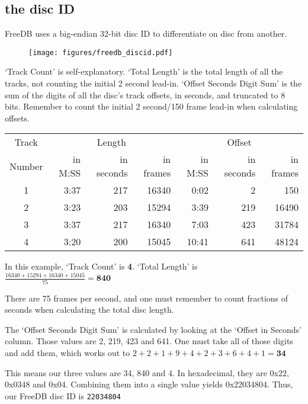 \pagebreak

\subsection{the disc ID}
FreeDB uses a big-endian 32-bit disc ID to differentiate
on disc from another.

\begin{figure}[h]
\texttt{[image: figures/freedb\_discid.pdf]}
\end{figure}
\par
\noindent
`Track Count' is self-explanatory.
`Total Length' is the total length of all the tracks, not
counting the initial 2 second lead-in.
`Offset Seconds Digit Sum' is the sum of the digits of all
the disc's track offsets, in seconds, and truncated to 8 bits.
Remember to count the initial 2 second/150 frame lead-in when calculating
offsets.
\begin{table}[h]
\begin{tabular}{|c||r|r|r||r|r|r|}
\hline
Track & \multicolumn{3}{c||}{Length} & \multicolumn{3}{c|}{Offset} \\
Number & in M:SS & in seconds & in frames & in M:SS & in seconds & in frames \\
\hline
1 & 3:37 & 217 & 16340 & 0:02 & 2 & 150 \\
2 & 3:23 & 203 & 15294 & 3:39 & 219 & 16490 \\
3 & 3:37 & 217 & 16340 & 7:03 & 423 & 31784 \\
4 & 3:20 & 200 & 15045 & 10:41 & 641 & 48124 \\
\hline
\end{tabular}
\end{table}
\par
\noindent
In this example, `Track Count' is \textbf{4}.
`Total Length' is
$\frac{16340 + 15294 + 16340 + 15045}{75} = \textbf{840}$

There are 75 frames per second, and one must remember to count
fractions of seconds when calculating the total disc length.

The `Offset Seconds Digit Sum' is calculated by looking at the
`Offset in Seconds' column.
Those values are 2, 219, 423 and 641.
One must take all of those digits and add them, which works out to
$2 + 2 + 1 + 9 + 4 + 2 + 3 + 6 + 4 + 1 = \textbf{34}$

This means our three values are 34, 840 and 4.
In hexadecimal, they are 0x22, 0x0348 and 0x04.
Combining them into a single value yields 0x22034804.
Thus, our FreeDB disc ID is \texttt{22034804}

